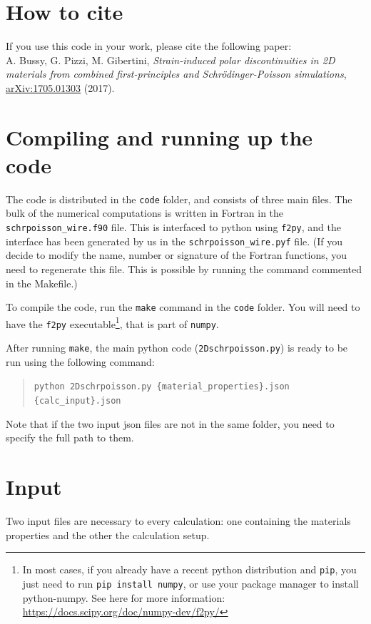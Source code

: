 \documentclass[a4paper,12pt]{article}
\begin{document}
\section{How to cite}
If you use this code in your work, please cite the following paper: \\
A. Bussy, G. Pizzi, M. Gibertini, \emph{Strain-induced polar discontinuities in 2D materials from combined first-principles and Schr\"odinger-Poisson simulations}, \underline{\href{http://arxiv.org/abs/1705.01303}{arXiv:1705.01303}} (2017).

\section{Compiling and running up the code}
The code is distributed in the \texttt{code} folder, and consists of three main files.
The bulk of the numerical computations is written in Fortran in the  \texttt{schrpoisson\_wire.f90} file. This is interfaced to python using \texttt{f2py}, and the interface has been generated by us in the \texttt{schrpoisson\_wire.pyf} file. (If you decide to modify the name, number or signature of the Fortran functions, you need to regenerate this file. This is possible by running the command commented in the Makefile.)

To compile the code, run the \texttt{make} command in the \texttt{code} folder.
You will need to have the \texttt{f2py} executable\footnote{In most cases, if you already have a recent python distribution and \texttt{pip}, you just need to run \texttt{pip install numpy}, or use your package manager to install python-numpy. See here for more information: \url{https://docs.scipy.org/doc/numpy-dev/f2py/}}, that is part of \texttt{numpy}. 

After running \texttt{make}, the main python code (\texttt{2Dschrpoisson.py}) is ready to be run using the following command:

\begin{quote}
\texttt{python 2Dschrpoisson.py \{material\_properties\}.json  \{calc\_input\}.json}
\end{quote}

Note that if the two input json files are not in the same folder, you need to specify the full path to them.

\section{\label{sec:input}Input}
Two input files are necessary to every calculation: one containing the materials properties and the other the calculation setup. 
\end{document}
